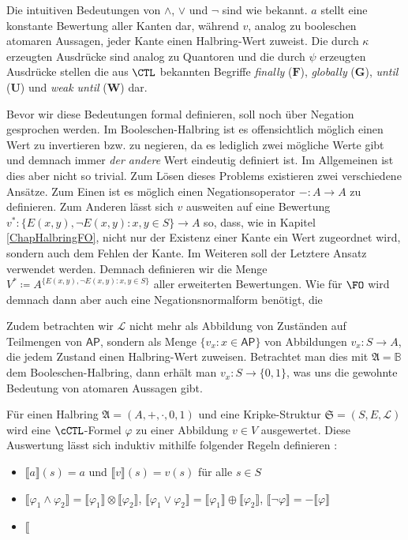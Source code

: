 Die intuitiven Bedeutungen von $\land$, $\lor$ und $\neg$ sind wie bekannt.
$a$ stellt eine konstante Bewertung aller Kanten dar, während $v$, analog zu booleschen atomaren Aussagen, jeder Kante einen Halbring-Wert zuweist.
Die durch $\kappa$ erzeugten Ausdrücke sind analog zu Quantoren und die durch $\psi$ erzeugten Ausdrücke stellen die aus $\CTL$ bekannten Begriffe \textit{finally} ($\boldsymbol{F}$), \textit{globally} ($\boldsymbol{G}$), \textit{until} ($\boldsymbol{U}$) und \textit{weak until} ($\boldsymbol{W}$) dar.

Bevor wir diese Bedeutungen formal definieren, soll noch über Negation gesprochen werden.
Im Booleschen-Halbring ist es offensichtlich möglich einen Wert zu invertieren bzw. zu negieren, da es lediglich zwei mögliche Werte gibt und demnach immer \textit{der andere} Wert eindeutig definiert ist.
Im Allgemeinen ist dies aber nicht so trivial. Zum Lösen dieses Problems existieren zwei verschiedene Ansätze. 
Zum Einen ist es möglich einen Negationsoperator $-:A\to A$ zu definieren. 
Zum Anderen lässt sich $v$ ausweiten auf eine Bewertung $v^*:\{E(x,y), \neg E(x,y) : x,y\in S\}\to A$ so, dass, wie in Kapitel \ref{ChapHalbringFO}, nicht nur der Existenz einer Kante ein Wert zugeordnet wird, sondern auch dem Fehlen der Kante.
Im Weiteren soll der Letztere Ansatz verwendet werden.
Demnach definieren wir die Menge $V^*\coloneqq A^{\{E(x,y), \neg E(x,y) : x,y\in S\}}$ aller erweiterten Bewertungen.
Wie für $\FO$ wird demnach dann aber auch eine Negationsnormalform benötigt, die

Zudem betrachten wir $\mathcal{L}$ nicht mehr als Abbildung von Zuständen auf Teilmengen von $\mathsf{AP}$, sondern als Menge $\{v_x : x\in \mathsf{AP}\}$ von Abbildungen $v_x:S\to A$, die jedem Zustand einen Halbring-Wert zuweisen.
Betrachtet man dies mit $\mathfrak{A}=\mathbb{B}$ dem Booleschen-Halbring, dann erhält man $v_x:S\to \{0,1\}$, was uns die gewohnte Bedeutung von atomaren Aussagen gibt.

\begin{definition}
	Für einen Halbring $\mathfrak{A}=(A,+,\cdot,0,1)$ und eine Kripke-Struktur $\mathfrak{S}=(S,E,\mathcal{L})$ wird eine $\cCTL$-Formel $\varphi$ zu einer Abbildung $v\in V$ ausgewertet.
	Diese Auswertung lässt sich induktiv mithilfe folgender Regeln definieren \cite{lluch2005quantitative}:
	\begin{itemize}
		\item $\llbracket a \rrbracket(s) = a$ und $\llbracket v \rrbracket(s) = v(s)$ für alle $s\in S$
		\item $\llbracket \varphi_1 \land \varphi_2 \rrbracket = \llbracket\varphi_1\rrbracket \otimes \llbracket\varphi_2\rrbracket$, $\llbracket \varphi_1\lor\varphi_2 \rrbracket = \llbracket \varphi_1\rrbracket \oplus \llbracket \varphi_2\rrbracket$, $\llbracket \neg \varphi \rrbracket = -\llbracket \varphi \rrbracket$
		\item $\llbracket $
	\end{itemize}
\end{definition}


